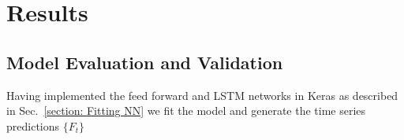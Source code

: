 \documentclass[10pt,a4paper]{article}
\begin{document}
\section{Results}
%
\subsection{Model Evaluation and Validation}
%
Having implemented the feed forward and LSTM networks in Keras as described in Sec.~\ref{section: Fitting NN} we fit the model and generate the time series predictions $\lbrace F_t \rbrace$ 
\end{document}
